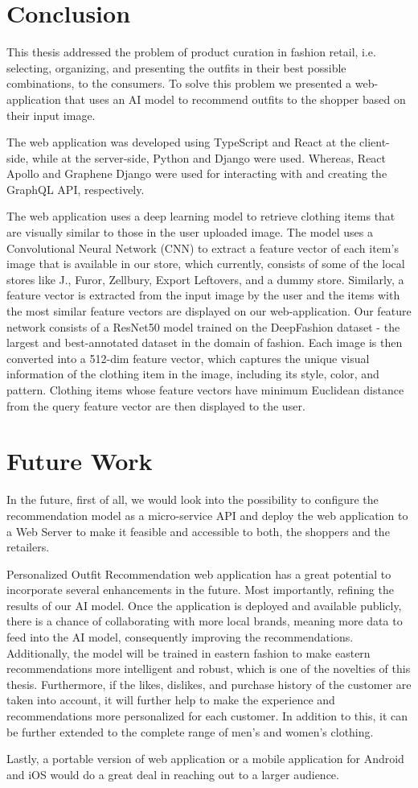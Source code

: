 \section{Conclusion}
This thesis addressed the problem of product curation in fashion retail, i.e. selecting, organizing, and presenting the outfits in their best possible combinations, to the consumers. To solve this problem we presented a web-application that uses an AI model to recommend outfits to the shopper based on their input image. 

The web application was developed using TypeScript and React at the client-side, while at the server-side, Python and Django were used.  Whereas, React Apollo and Graphene Django were used for interacting with and creating the GraphQL API, respectively. 

The web application uses a  deep learning model to retrieve clothing items that are visually similar to those in the user uploaded image. The model uses a Convolutional Neural Network (CNN) to extract a feature vector of each item's image that is available in our store, which currently, consists of some of the local stores like J., Furor, Zellbury, Export Leftovers, and a dummy store. Similarly, a feature vector is extracted from the input image by the user and the items with the most similar feature vectors are displayed on our web-application. Our feature network consists of a ResNet50 model trained on the DeepFashion dataset - the largest and best-annotated dataset in the domain of fashion. Each image is then converted into a 512-dim feature vector, which captures the unique visual information of the clothing item in the image, including its style, color, and pattern. Clothing items whose feature vectors have minimum Euclidean distance from the query feature vector are then displayed to the user.
\section{Future Work}

In the future, first of all, we would look into the possibility to configure the recommendation model as a micro-service API and deploy the web application to a Web Server to make it feasible and accessible to both, the shoppers and the retailers.

Personalized Outfit Recommendation web application has a great potential to incorporate several enhancements in the future. Most importantly, refining the results of our AI model. Once the application is deployed and available publicly, there is a chance of collaborating with more local brands, meaning more data to feed into the AI model, consequently improving the recommendations. Additionally, the model will be trained in eastern fashion to make eastern recommendations more intelligent and robust, which is one of the novelties of this thesis. Furthermore, if the likes, dislikes, and purchase history of the customer are taken into account, it will further help to make the experience and recommendations more personalized for each customer. In addition to this, it can be further extended to the complete range of men's and women's clothing.

Lastly, a portable version of web application or a mobile application for Android and iOS would do a great deal in reaching out to a larger audience.